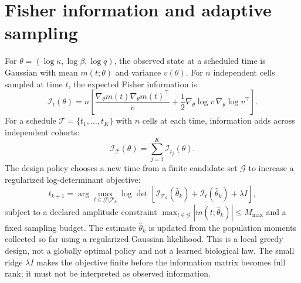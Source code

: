 \documentclass[11pt,a4paper]{article}
\newcommand{\FIM}{\mathcal{I}}
\begin{document}
\section{Fisher information and adaptive sampling}
For $\theta=(\log\kappa,\log\beta,\log q)$, the observed state at a scheduled time is Gaussian with mean $m(t;\theta)$ and variance $v(\theta)$. For $n$ independent cells sampled at time $t$, the expected Fisher information is
\begin{equation}
\FIM_t(\theta)=n\left[
\frac{\nabla_\theta m(t)\nabla_\theta m(t)^\top}{v}
+\frac{1}{2}\nabla_\theta\log v\,\nabla_\theta\log v^\top
\right].
\label{eq:fim}
\end{equation}
For a schedule $\mathcal{T}=\{t_1,\ldots,t_K\}$ with $n$ cells at each time, information adds across independent cohorts:
\begin{equation}
\FIM_{\mathcal{T}}(\theta)=\sum_{j=1}^{K}\FIM_{t_j}(\theta).
\label{eq:fim_sum}
\end{equation}
The design policy chooses a new time from a finite candidate set $\mathcal{G}$ to increase a regularized log-determinant objective:
\begin{equation}
t_{k+1}=\arg\max_{t\in\mathcal{G}\setminus\mathcal{T}_k}
\log\det\left[\FIM_{\mathcal{T}_k}(\widehat\theta_k)+\FIM_t(\widehat\theta_k)+\lambda I\right],
\label{eq:greedy}
\end{equation}
subject to a declared amplitude constraint $\max_{t\in\mathcal{G}}|m(t;\widehat\theta_k)|\le M_{\max}$ and a fixed sampling budget. The estimate $\widehat\theta_k$ is updated from the population moments collected so far using a regularized Gaussian likelihood. This is a local greedy design, not a globally optimal policy and not a learned biological law. The small ridge $\lambda I$ makes the objective finite before the information matrix becomes full rank; it must not be interpreted as observed information.
\end{document}
